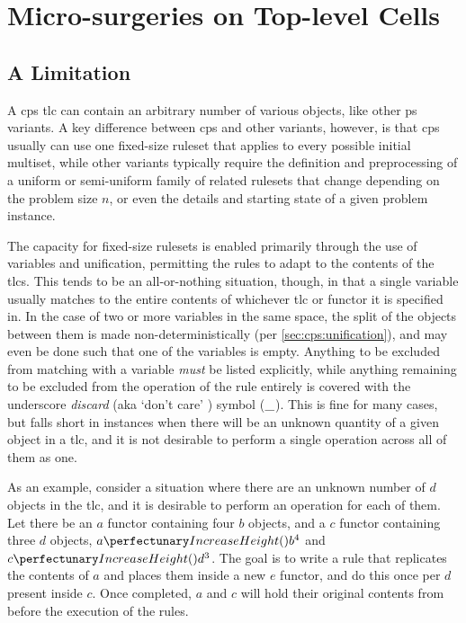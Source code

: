 \section{\label{sec:cps:microsurg}Micro-surgeries on  Top-level Cells}
\subsection{A Limitation}
A \gls{cps} \gls{tlc} can contain an arbitrary number of various objects, like other \gls{ps} variants.  A key difference between \gls{cps} and other variants, however, is that \gls{cps} usually can use one fixed-size \gls{ruleset} that applies to every possible initial multiset, while other variants typically require the definition and preprocessing of a uniform or semi-uniform family of related \glspl{ruleset} that change depending on the problem size \(n\), or even the details and starting state of a given problem instance.

The capacity for fixed-size \glspl{ruleset} is enabled primarily through the use of variables and unification, permitting the rules to adapt to the contents of the \glspl{tlc}.  This tends to be an all-or-nothing situation, though, in that a single variable usually matches to the entire contents of whichever \gls{tlc} or \gls{functor} it is specified in.  In the case of two or more variables in the same space, the split of the objects between them is made non-deterministically (per \cref{sec:cps:unification}), and may even be done such that one of the variables is empty.  Anything to be excluded from matching with a variable \emph{must} be listed explicitly, while anything remaining to be excluded from the operation of the rule entirely is covered with the underscore \emph{discard} (aka  `don't care' ) symbol (\(\_\)).  This is fine for many cases, but falls short in instances when there will be an unknown quantity of a given object in a \gls{tlc}, and it is not desirable to perform a single operation across all of them as one.

As an example, consider a situation where there are an unknown number of \(d\) objects in the \gls{tlc}, and it is desirable to perform an operation for each of them.  Let there be an \(a\) \gls{functor} containing four \(b\) objects, and a \(c\) \gls{functor} containing three \(d\) objects, \ie{} \(\cpfunc{a}{b^4}\) and \(\cpfunc{c}{d^3}\).  The goal is to write a rule that replicates the contents of \(a\) and places them inside a new \(e\) \gls{functor}, and do this once per \(d\) present inside \(c\).  Once completed, \(a\) and \(c\) will hold their original contents from before the execution of the rules.

